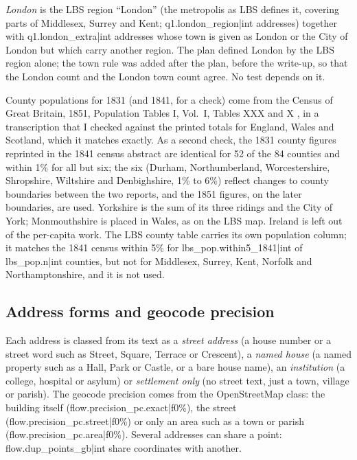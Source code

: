 \documentclass[11pt,a4paper]{article}
\begin{document}
\textit{London} is the LBS region ``London'' (the metropolis as LBS defines it, covering parts of Middlesex, Surrey and Kent; {{q1.london_region|int}} addresses) together with {{q1.london_extra|int}} addresses whose town is given as London or the City of London but which carry another region. The plan defined London by the LBS region alone; the town rule was added after the plan, before the write-up, so that the London count and the London town count agree. No test depends on it.

County populations for 1831 (and 1841, for a check) come from the Census of Great Britain, 1851, Population Tables I, Vol.~I, Tables XXX and X \citep{census1851}, in a transcription \citep{ditto2026} that I checked against the printed totals for England, Wales and Scotland, which it matches exactly. As a second check, the 1831 county figures reprinted in the 1841 census abstract \citep{vob2026} are identical for 52 of the 84 counties and within 1\% for all but six; the six (Durham, Northumberland, Worcestershire, Shropshire, Wiltshire and Denbighshire, 1\% to 6\%) reflect changes to county boundaries between the two reports, and the 1851 figures, on the later boundaries, are used. Yorkshire is the sum of its three ridings and the City of York; Monmouthshire is placed in Wales, as on the LBS map. Ireland is left out of the per-capita work. The LBS county table carries its own population column; it matches the 1841 census within 5\% for {{lbs_pop.within5_1841|int}} of {{lbs_pop.n|int}} counties, but not for Middlesex, Surrey, Kent, Norfolk and Northamptonshire, and it is not used.

\subsection{Address forms and geocode precision}
Each address is classed from its text as a \textit{street address} (a house number or a street word such as Street, Square, Terrace or Crescent), a \textit{named house} (a named property such as a Hall, Park or Castle, or a bare house name), an \textit{institution} (a college, hospital or asylum) or \textit{settlement only} (no street text, just a town, village or parish). The geocode precision comes from the OpenStreetMap class: the building itself ({{flow.precision_pc.exact|f0}}\%), the street ({{flow.precision_pc.street|f0}}\%) or only an area such as a town or parish ({{flow.precision_pc.area|f0}}\%). Several addresses can share a point: {{flow.dup_points_gb|int}} share coordinates with another.
\end{document}

